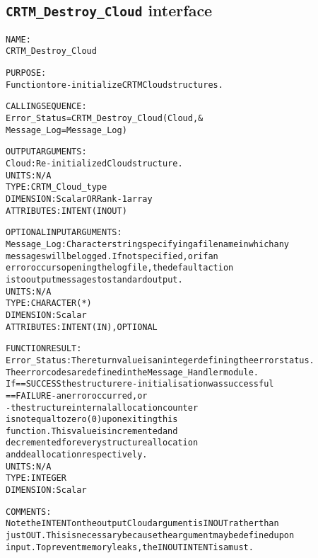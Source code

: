 \subsection{\texttt{CRTM\_Destroy\_Cloud} interface}
  \label{sec:CRTM_Destroy_Cloud_interface}
  \begin{alltt}
 
  NAME:
        CRTM_Destroy_Cloud
  
  PURPOSE:
        Function to re-initialize CRTM Cloud structures.
 
  CALLING SEQUENCE:
        Error_Status = CRTM_Destroy_Cloud( Cloud                  , &
                                           Message_Log=Message_Log  )
 
  OUTPUT ARGUMENTS:
        Cloud:        Re-initialized Cloud structure.
                      UNITS:      N/A
                      TYPE:       CRTM_Cloud_type
                      DIMENSION:  Scalar OR Rank-1 array
                      ATTRIBUTES: INTENT(IN OUT)
 
  OPTIONAL INPUT ARGUMENTS:
        Message_Log:  Character string specifying a filename in which any
                      messages will be logged. If not specified, or if an
                      error occurs opening the log file, the default action
                      is to output messages to standard output.
                      UNITS:      N/A
                      TYPE:       CHARACTER(*)
                      DIMENSION:  Scalar
                      ATTRIBUTES: INTENT(IN), OPTIONAL
 
  FUNCTION RESULT:
        Error_Status: The return value is an integer defining the error status.
                      The error codes are defined in the Message_Handler module.
                      If == SUCCESS the structure re-initialisation was successful
                         == FAILURE - an error occurred, or
                                    - the structure internal allocation counter
                                      is not equal to zero (0) upon exiting this
                                      function. This value is incremented and
                                      decremented for every structure allocation
                                      and deallocation respectively.
                      UNITS:      N/A
                      TYPE:       INTEGER
                      DIMENSION:  Scalar
 
  COMMENTS:
        Note the INTENT on the output Cloud argument is IN OUT rather than
        just OUT. This is necessary because the argument may be defined upon
        input. To prevent memory leaks, the IN OUT INTENT is a must.
 
  \end{alltt}
